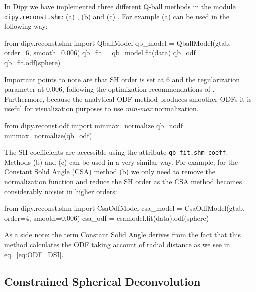 \documentclass{bioinfo}
\begin{document}
In Dipy we have implemented three different Q-ball methods in the
module \texttt{dipy.reconst.shm}: (a)
\citet{descoteaux-angelino-etal:07}, (b) \citet{aganj-lenglet-etal:10}
and (c) \citet{tristan-vega-westin-etal:09}. For
example (a) can be used in the following way:
\begin{python}
from dipy.reconst.shm import QballModel
qb_model = QballModel(gtab, order=6, smooth=0.006)
qb_fit = qb_model.fit(data)
qb_odf = qb_fit.odf(sphere)
\end{python}
Important points to note are that SH order is set at $6$ and the regularization
parameter at $0.006$, following the optimization recommendations of
\citet{descoteaux-angelino-etal:06c}. Furthermore, because the
analytical ODF method produces smoother ODFs it is useful for visualization purposes to use \emph{min-max}
normalization.
\begin{python}
from dipy.reconst.odf import minmax_normalize
qb_nodf = minmax_normalize(qb_odf)
\end{python}
The SH coefficients are accessible using the attribute
\texttt{qb\_fit.shm\_coeff}. Methods (b) and (c) can be used in a very similar
way. For example, for the Constant Solid Angle (CSA)
\citep{aganj-lenglet-etal:10} method (b) we only need to remove the
normalization function and reduce the SH order as the CSA method becomes
considerably noisier in higher orders:
\begin{python}
from dipy.reconst.shm import CsaOdfModel
csa_model = CsaOdfModel(gtab, order=4,
                        smooth=0.006)
csa_odf = csamodel.fit(data).odf(sphere)
\end{python}
As a side note: the term Constant Solid Angle derives from the fact that this
method calculates the ODF taking account of radial distance as we see in
eq.~\ref{eq:ODF_DSI}.

\subsection{Constrained Spherical Deconvolution}
\end{document}
